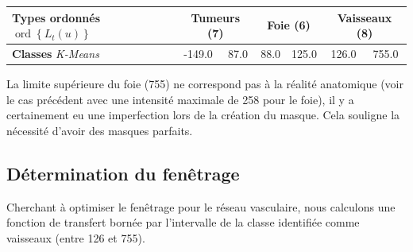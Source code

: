 


	\begin{center}
		\begin{tabular}{|l|cccccc|}
			\hline
			 	\textbf{Types ordonnés} $\operatorname{ord} \left\{ L_t(u) \right\}$	& \multicolumn{2}{|c|}{Tumeurs (7)} 	& \multicolumn{2}{|c|}{Foie (6)} 	& \multicolumn{2}{|c|}{Vaisseaux (8)}  		 \\
			 \hline
			 	\textbf{Classes} \emph{K-Means}	& -149.0 & 87.0 & 88.0 & 125.0 & 126.0 & 755.0 	 \\
			 \hline
		\end{tabular}
		\label{tab:im_3_2_labeling}
	\end{center}

	La limite supérieure du foie (755) ne correspond pas à la réalité anatomique (voir le cas précédent avec une intensité maximale de 258 pour le foie), il y a certainement eu une imperfection lors de la création du masque. Cela souligne la nécessité d'avoir des masques parfaits.

				
		\subsection{Détermination du fenêtrage}
	Cherchant à optimiser le fenêtrage pour le réseau vasculaire, nous calculons une fonction de transfert bornée par l'intervalle de la classe identifiée comme vaisseaux (entre 126 et 755).%



